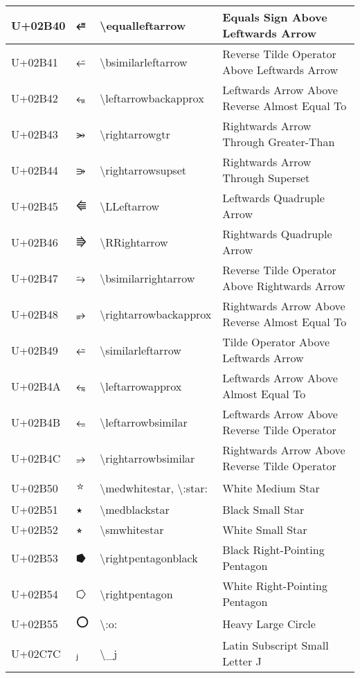 \begin{table}[h]
\begin{tabulary}{\linewidth}{|L|L|L|L|}
\hline
U+02B40 & ⭀ & {\textbackslash}equalleftarrow & Equals Sign Above Leftwards Arrow \\
\hline
U+02B41 & ⭁ & {\textbackslash}bsimilarleftarrow & Reverse Tilde Operator Above Leftwards Arrow \\
\hline
U+02B42 & ⭂ & {\textbackslash}leftarrowbackapprox & Leftwards Arrow Above Reverse Almost Equal To \\
\hline
U+02B43 & ⭃ & {\textbackslash}rightarrowgtr & Rightwards Arrow Through Greater-Than \\
\hline
U+02B44 & ⭄ & {\textbackslash}rightarrowsupset & Rightwards Arrow Through Superset \\
\hline
U+02B45 & ⭅ & {\textbackslash}LLeftarrow & Leftwards Quadruple Arrow \\
\hline
U+02B46 & ⭆ & {\textbackslash}RRightarrow & Rightwards Quadruple Arrow \\
\hline
U+02B47 & ⭇ & {\textbackslash}bsimilarrightarrow & Reverse Tilde Operator Above Rightwards Arrow \\
\hline
U+02B48 & ⭈ & {\textbackslash}rightarrowbackapprox & Rightwards Arrow Above Reverse Almost Equal To \\
\hline
U+02B49 & ⭉ & {\textbackslash}similarleftarrow & Tilde Operator Above Leftwards Arrow \\
\hline
U+02B4A & ⭊ & {\textbackslash}leftarrowapprox & Leftwards Arrow Above Almost Equal To \\
\hline
U+02B4B & ⭋ & {\textbackslash}leftarrowbsimilar & Leftwards Arrow Above Reverse Tilde Operator \\
\hline
U+02B4C & ⭌ & {\textbackslash}rightarrowbsimilar & Rightwards Arrow Above Reverse Tilde Operator \\
\hline
U+02B50 & ⭐ & {\textbackslash}medwhitestar, {\textbackslash}:star: & White Medium Star \\
\hline
U+02B51 & ⭑ & {\textbackslash}medblackstar & Black Small Star \\
\hline
U+02B52 & ⭒ & {\textbackslash}smwhitestar & White Small Star \\
\hline
U+02B53 & ⭓ & {\textbackslash}rightpentagonblack & Black Right-Pointing Pentagon \\
\hline
U+02B54 & ⭔ & {\textbackslash}rightpentagon & White Right-Pointing Pentagon \\
\hline
U+02B55 & ⭕ & {\textbackslash}:o: & Heavy Large Circle \\
\hline
U+02C7C & ⱼ & {\textbackslash}\_j & Latin Subscript Small Letter J \\

\end{tabulary}
\end{table}
